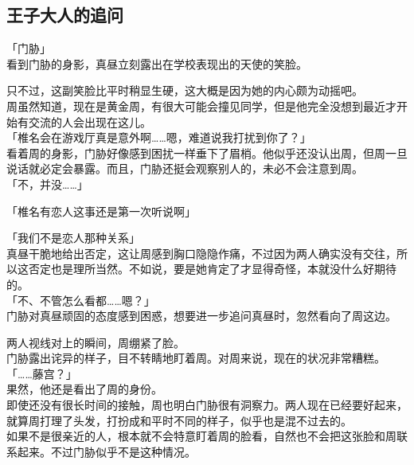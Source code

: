 \subsection{王子大人的追问}

「门胁」\\

看到门胁的身影，真昼立刻露出在学校表现出的天使的笑脸。

只不过，这副笑脸比平时稍显生硬，这大概是因为她的内心颇为动摇吧。\\

周虽然知道，现在是黄金周，有很大可能会撞见同学，但是他完全没想到最近才开始有交流的人会出现在这儿。\\

「椎名会在游戏厅真是意外啊……嗯，难道说我打扰到你了？」\\

看着周的身影，门胁好像感到困扰一样垂下了眉梢。他似乎还没认出周，但周一旦说话就必定会暴露。而且，门胁还挺会观察别人的，未必不会注意到周。\\

「不，并没……」

「椎名有恋人这事还是第一次听说啊」

「我们不是恋人那种关系」\\

真昼干脆地给出否定，这让周感到胸口隐隐作痛，不过因为两人确实没有交往，所以这否定也是理所当然。不如说，要是她肯定了才显得奇怪，本就没什么好期待的。\\

「不、不管怎么看都……嗯？」\\

门胁对真昼顽固的态度感到困惑，想要进一步追问真昼时，忽然看向了周这边。

两人视线对上的瞬间，周绷紧了脸。\\

门胁露出诧异的样子，目不转睛地盯着周。对周来说，现在的状况非常糟糕。\\

「……藤宫？」\\

果然，他还是看出了周的身份。\\

即使还没有很长时间的接触，周也明白门胁很有洞察力。两人现在已经要好起来，就算周打理了头发，打扮成和平时不同的样子，似乎也是混不过去的。\\

如果不是很亲近的人，根本就不会特意盯着周的脸看，自然也不会把这张脸和周联系起来。不过门胁似乎不是这种情况。\\

